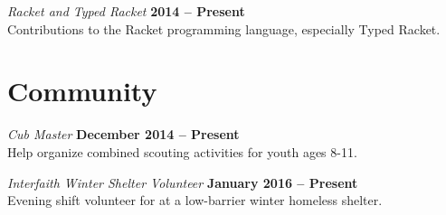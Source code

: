 \documentclass[margin,line]{res}
\begin{document}
\begin{resume}
{\em Racket and Typed Racket} \hfill {\bf 2014 --
  Present}\\ Contributions to the Racket programming language,
especially Typed Racket.

\section{\sc Community}

{\em Cub Master} \hfill {\bf December 2014 -- Present}\\
Help organize combined scouting activities for youth ages 8-11.

\vspace{-.3cm} {\em Interfaith Winter Shelter Volunteer} \hfill {\bf
  January 2016 -- Present }\\ Evening shift volunteer for at a
low-barrier winter homeless shelter.


\end{resume}
\end{document}
